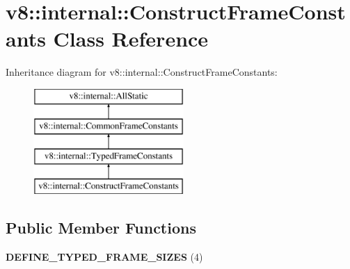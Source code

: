 \hypertarget{classv8_1_1internal_1_1_construct_frame_constants}{}\section{v8\+:\+:internal\+:\+:Construct\+Frame\+Constants Class Reference}
\label{classv8_1_1internal_1_1_construct_frame_constants}
Inheritance diagram for v8\+:\+:internal\+:\+:Construct\+Frame\+Constants\+:\begin{figure}[H]
\begin{center}
\leavevmode
\includegraphics[height=4.000000cm]{classv8_1_1internal_1_1_construct_frame_constants}
\end{center}
\end{figure}
\subsection*{Public Member Functions}
\begin{DoxyCompactItemize}
\item 
{\bfseries D\+E\+F\+I\+N\+E\+\_\+\+T\+Y\+P\+E\+D\+\_\+\+F\+R\+A\+M\+E\+\_\+\+S\+I\+Z\+ES} (4)\hypertarget{classv8_1_1internal_1_1_construct_frame_constants_a4a815a5e21f53f6e3a9d0b8d6534d8f1}{}\label{classv8_1_1internal_1_1_construct_frame_constants_a4a815a5e21f53f6e3a9d0b8d6534d8f1}

\end{DoxyCompactItemize}
